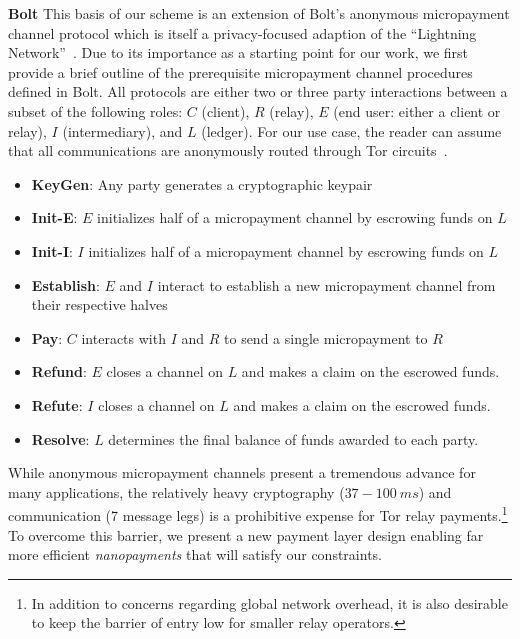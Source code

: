 \textbf{Bolt} This basis of our scheme is an extension of Bolt's anonymous
micropayment channel protocol which is itself a privacy-focused adaption of the
``Lightning Network''~\cite{poon2016bitcoin}. Due to its importance as a
starting point for our work, we first provide a brief outline of the
prerequisite micropayment channel procedures defined in Bolt. All protocols are
either two or three party interactions between a subset of the following roles:
$C$ (client), $R$ (relay), $E$ (end user: either a client or relay), $I$
(intermediary), and $L$ (ledger). For our use case, the reader can assume that
all communications are anonymously routed through Tor
circuits~\cite{green2017bolt}.

\begin{itemize}
\item \textbf{KeyGen}: Any party generates a cryptographic keypair
\item \textbf{Init-E}: $E$ initializes half of a micropayment channel by
  escrowing funds on $L$
\item \textbf{Init-I}: $I$ initializes half of a micropayment channel by
  escrowing funds on $L$
\item \textbf{Establish}: $E$ and $I$ interact to establish a new micropayment
  channel from their respective halves
\item \textbf{Pay}: $C$ interacts with $I$ and $R$ to send a single micropayment to $R$
\item \textbf{Refund}: $E$ closes a channel on $L$ and makes a claim on
  the escrowed funds.
\item \textbf{Refute}: $I$ closes a channel on $L$ and makes a claim on
  the escrowed funds.
\item \textbf{Resolve}: $L$ determines the final balance of funds awarded to
  each party.
\end{itemize}

While anonymous micropayment channels present a tremendous advance for many
applications, the relatively heavy cryptography ($37-100\ ms$) and communication
(7 message legs) is a prohibitive expense for Tor relay payments.\footnote{In
  addition to concerns regarding global network overhead, it is also desirable
  to keep the barrier of entry low for smaller relay operators.} To overcome
this barrier, we present a new payment layer design enabling far more efficient
\emph{nanopayments} that will satisfy our constraints.

